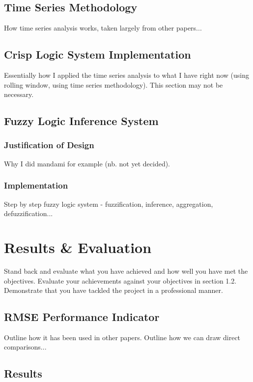 \documentclass{article}
\begin{document}
\subsection{Time Series Methodology}

How time series analysis works, taken largely from other papers...

\subsection{Crisp Logic System Implementation}

Essentially how I applied the time series analysis to what I have right now (using rolling window, using time series methodology). This section may not be necessary.

\subsection{Fuzzy Logic Inference System}

\subsubsection{Justification of Design}

Why I did mandami for example (nb. not yet decided).

\subsubsection{Implementation}

Step by step fuzzy logic system - fuzzification, inference, aggregation, defuzzification...

\section{Results \& Evaluation}
Stand back and evaluate what you have achieved and how well you have met the objectives. Evaluate your achievements against your objectives in section 1.2. Demonstrate that you have tackled the project in a professional manner. 

\subsection{RMSE Performance Indicator}

Outline how it has been used in other papers. Outline how we can draw direct comparisons...

\subsection{Results}
\end{document}
